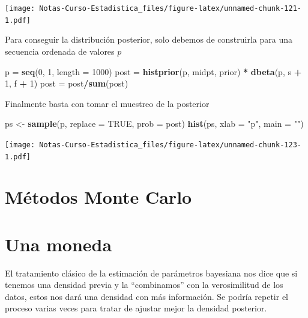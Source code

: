 \documentclass[
  12pt,
]{book}
\newenvironment{Shaded}{\begin{snugshade}}{\end{snugshade}}
\newcommand{\DataTypeTok}[1]{\textcolor[rgb]{0.13,0.29,0.53}{#1}}
\newcommand{\DecValTok}[1]{\textcolor[rgb]{0.00,0.00,0.81}{#1}}
\newcommand{\KeywordTok}[1]{\textcolor[rgb]{0.13,0.29,0.53}{\textbf{#1}}}
\newcommand{\NormalTok}[1]{#1}
\newcommand{\OperatorTok}[1]{\textcolor[rgb]{0.81,0.36,0.00}{\textbf{#1}}}
\newcommand{\OtherTok}[1]{\textcolor[rgb]{0.56,0.35,0.01}{#1}}
\newcommand{\StringTok}[1]{\textcolor[rgb]{0.31,0.60,0.02}{#1}}
\theoremstyle{definition}
\theoremstyle{definition}
\theoremstyle{definition}
\theoremstyle{remark}
\begin{document}
\texttt{[image: Notas-Curso-Estadistica\_files/figure-latex/unnamed-chunk-121-1.pdf]}

Para conseguir la distribución posterior, solo debemos de construirla para una secuencia ordenada de valores \(p\)

\begin{Shaded}
\begin{Highlighting}[]
\NormalTok{p =}\StringTok{ }\KeywordTok{seq}\NormalTok{(}\DecValTok{0}\NormalTok{, }\DecValTok{1}\NormalTok{, }\DataTypeTok{length =} \DecValTok{1000}\NormalTok{)}
\NormalTok{post =}\StringTok{ }\KeywordTok{histprior}\NormalTok{(p, midpt, prior) }\OperatorTok{*}\StringTok{ }\KeywordTok{dbeta}\NormalTok{(p, s }\OperatorTok{+}\StringTok{ }\DecValTok{1}\NormalTok{, }
\NormalTok{    f }\OperatorTok{+}\StringTok{ }\DecValTok{1}\NormalTok{)}
\NormalTok{post =}\StringTok{ }\NormalTok{post}\OperatorTok{/}\KeywordTok{sum}\NormalTok{(post)}
\end{Highlighting}
\end{Shaded}

Finalmente basta con tomar el muestreo de la posterior

\begin{Shaded}
\begin{Highlighting}[]
\NormalTok{ps <-}\StringTok{ }\KeywordTok{sample}\NormalTok{(p, }\DataTypeTok{replace =} \OtherTok{TRUE}\NormalTok{, }\DataTypeTok{prob =}\NormalTok{ post)}
\KeywordTok{hist}\NormalTok{(ps, }\DataTypeTok{xlab =} \StringTok{"p"}\NormalTok{, }\DataTypeTok{main =} \StringTok{""}\NormalTok{)}
\end{Highlighting}
\end{Shaded}

\texttt{[image: Notas-Curso-Estadistica\_files/figure-latex/unnamed-chunk-123-1.pdf]}

\hypertarget{muxe9todos-monte-carlo}{%
\section{Métodos Monte Carlo}\label{muxe9todos-monte-carlo}}

\hypertarget{una-moneda}{%
\section{Una moneda}\label{una-moneda}}

El tratamiento clásico de la estimación de parámetros bayesiana nos dice que si tenemos una densidad previa y la ``combinamos'' con la verosimilitud de los datos, estos nos dará una densidad con más información. Se podría repetir el proceso varias veces para tratar de ajustar mejor la densidad posterior.
\end{document}
